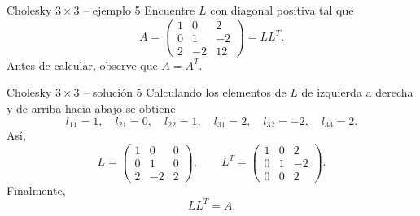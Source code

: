 \documentclass[aspectratio=169,10pt]{beamer}
\begin{document}
\begin{frame}{Cholesky $3\times 3$ -- ejemplo 5}
\small
Encuentre $L$ con diagonal positiva tal que
\[
A=\begin{pmatrix}1 & 0 & 2\\0 & 1 & -2\\2 & -2 & 12\end{pmatrix}=LL^T.
\]
Antes de calcular, observe que $A=A^T$.
\end{frame}
\begin{frame}{Cholesky $3\times 3$ -- solución 5}
\small
Calculando los elementos de $L$ de izquierda a derecha y de arriba hacia abajo se obtiene
\[
l_{11}=1,\quad l_{21}=0,\quad l_{22}=1,\quad l_{31}=2,\quad l_{32}=-2,\quad l_{33}=2.
\]
Así,
\[
L=\begin{pmatrix}1 & 0 & 0\\0 & 1 & 0\\2 & -2 & 2\end{pmatrix},\qquad L^T=\begin{pmatrix}1 & 0 & 2\\0 & 1 & -2\\0 & 0 & 2\end{pmatrix}.
\]
Finalmente,
\[
\boxed{LL^T=A}.
\]
\end{frame}
\end{document}
